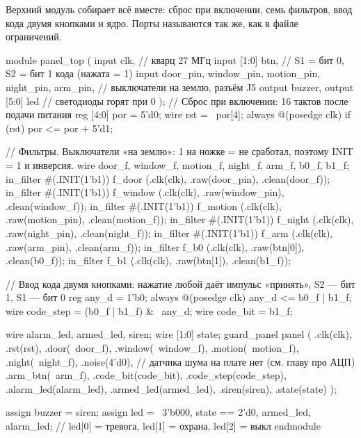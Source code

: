 Верхний модуль собирает всё вместе: сброс при включении, семь фильтров, ввод
кода двумя кнопками и ядро. Порты называются так же, как в файле ограничений.

\begin{vcode}
module panel_top (
    input        clk,            // кварц 27 МГц
    input  [1:0] btn,            // S1 = бит 0, S2 = бит 1 кода (нажата = 1)
    input        door_pin, window_pin, motion_pin, night_pin, arm_pin,   // выключатели на землю, разъём J5
    output       buzzer,
    output [5:0] led             // светодиоды горят при 0
);
    // Сброс при включении: 16 тактов после подачи питания
    reg [4:0] por = 5'd0;
    wire rst = ~por[4];
    always @(posedge clk) if (rst) por <= por + 5'd1;

    // Фильтры. Выключатели «на землю»: 1 на ножке = не сработал, поэтому INIT = 1 и инверсия.
    wire door_f, window_f, motion_f, night_f, arm_f, b0_f, b1_f;
    in_filter #(.INIT(1'b1)) f_door   (.clk(clk), .raw(door_pin),   .clean(door_f));
    in_filter #(.INIT(1'b1)) f_window (.clk(clk), .raw(window_pin), .clean(window_f));
    in_filter #(.INIT(1'b1)) f_motion (.clk(clk), .raw(motion_pin), .clean(motion_f));
    in_filter #(.INIT(1'b1)) f_night  (.clk(clk), .raw(night_pin),  .clean(night_f));
    in_filter #(.INIT(1'b1)) f_arm    (.clk(clk), .raw(arm_pin),    .clean(arm_f));
    in_filter                f_b0     (.clk(clk), .raw(btn[0]),     .clean(b0_f));
    in_filter                f_b1     (.clk(clk), .raw(btn[1]),     .clean(b1_f));

    // Ввод кода двумя кнопками: нажатие любой даёт импульс «принять», S2 --- бит 1, S1 --- бит 0
    reg any_d = 1'b0;
    always @(posedge clk) any_d <= b0_f | b1_f;
    wire code_step = (b0_f | b1_f) & ~any_d;
    wire code_bit  = b1_f;

    wire alarm_led, armed_led, siren;
    wire [1:0] state;
    guard_panel panel (
        .clk(clk), .rst(rst),
        .door(~door_f), .window(~window_f), .motion(~motion_f), .night(~night_f),
        .noise(4'd0),                          // датчика шума на плате нет (см. главу про АЦП)
        .arm_btn(~arm_f),
        .code_bit(code_bit), .code_step(code_step),
        .alarm_led(alarm_led), .armed_led(armed_led), .siren(siren), .state(state)
    );

    assign buzzer = siren;
    assign led    = ~{3'b000, state == 2'd0, armed_led, alarm_led};   // led[0] = тревога, led[1] = охрана, led[2] = выкл
endmodule
\end{vcode}

